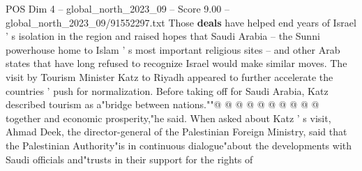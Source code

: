 \begin{textsample}{POS Dim 4 – global\_north\_2023\_09 – Score 9.00 – global\_north\_2023\_09/91552297.txt}
Those \textbf{deals} have helped end years of Israel ' s isolation in the region and raised hopes that Saudi Arabia -- the Sunni powerhouse home to Islam ' s most important religious sites -- and other Arab states that have long refused to recognize Israel would make similar moves.
The visit by Tourism Minister Katz to Riyadh appeared to further accelerate the countries ' push for normalization.
Before taking off for Saudi Arabia, Katz described tourism as a"bridge between nations.""@ @ @ @ @ @ @ @ @ @ together and economic prosperity,"he said.
When asked about Katz ' s visit, Ahmad Deek, the director-general of the Palestinian Foreign Ministry, said that the Palestinian Authority"is in continuous dialogue"about the developments with Saudi officials and"trusts in their support for the rights of

\end{textsample}
